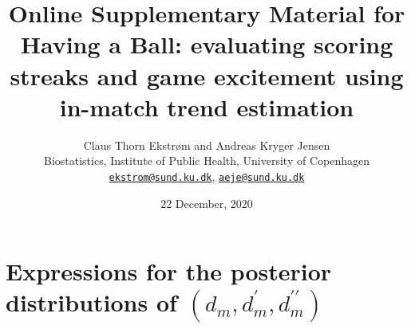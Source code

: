 \documentclass[
  11pt,
]{article}
\title{Online Supplementary Material for\\
Having a Ball: evaluating scoring streaks and game excitement using
in-match trend estimation}
\author{Claus Thorn Ekstrøm and Andreas Kryger Jensen\\
Biostatistics, Institute of Public Health, University of Copenhagen\\
\href{mailto:ekstrom@sund.ku.dk}{\nolinkurl{ekstrom@sund.ku.dk}},
\href{mailto:aeje@sund.ku.dk}{\nolinkurl{aeje@sund.ku.dk}}}
\date{22 December, 2020}
\theoremstyle{nonumberplain}
\begin{document}
\maketitle

\setcounter{bbsym4theta}{0}

\hypertarget{expressions-for-the-posterior-distributions-of-d_m-dprime_m-dprime-prime_m}{%
\section{\texorpdfstring{Expressions for the posterior distributions of
\((d_m, d^\prime_m, d^{\prime \prime}_m)\)}{Expressions for the posterior distributions of (d\_m, d\^{}\textbackslash prime\_m, d\^{}\{\textbackslash prime \textbackslash prime\}\_m)}}\label{expressions-for-the-posterior-distributions-of-d_m-dprime_m-dprime-prime_m}}
\end{document}
